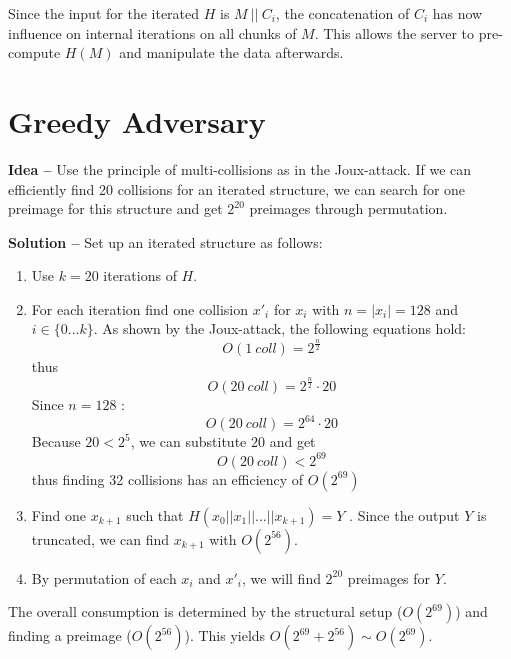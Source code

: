 Since the input for the iterated $ H $ is $ M\ ||\ C_{i} $, the concatenation of $ C_{i} $ has now influence on internal iterations on all chunks of $ M $. This allows the server to pre-compute $ H(M) $ and manipulate the data afterwards.

\newpage
\section{Greedy Adversary}

\textbf{Idea --} Use the principle of multi-collisions as in the Joux-attack. If we can efficiently find 20 collisions for an iterated structure, we can search for one preimage for this structure and get $ 2^{20} $ preimages through permutation.

\textbf{Solution --} Set up an iterated structure as follows:

\begin{enumerate}
\item Use $ k = 20 $ iterations of $ H $.
\item For each iteration find one collision $ x'_{i} $ for $ x_{i} $ with $ n = |x_{i}| = 128 $ and $ i \in \{0...k\} $. As shown by the Joux-attack, the following equations hold:
$$
O(1\ coll) = 2^{\frac{n}{2}}
$$ thus
$$
O(20\ coll) = 2^{\frac{n}{2}} \cdot 20
$$
Since $ n = 128 $ :
$$
O(20\ coll) = 2^{64} \cdot 20
$$
Because $ 20 < 2^{5} $, we can substitute $ 20 $ and get
$$
O(20\ coll) < 2^{69}
$$
thus finding 32 collisions has an efficiency of $ O(2^{69}) $
\item Find one $ x_{k+1} $ such that $ H(x_{0} || x_{1} || ... || x_{k+1} ) = Y $ . Since the output $ Y $ is truncated, we can find $ x_{k+1} $ with $ O(2^{56}) $.
\item By permutation of each $ x_{i} $ and $ x'_{i} $, we will find $ 2^{20} $ preimages for $ Y $.

\end{enumerate}

The overall consumption is determined by the structural setup ($ O(2^{69}) $) and finding a preimage ($ O( 2^{56} ) $). This yields $ O(2^{69} + 2^{56}) \sim O(2^{69} ) $.


